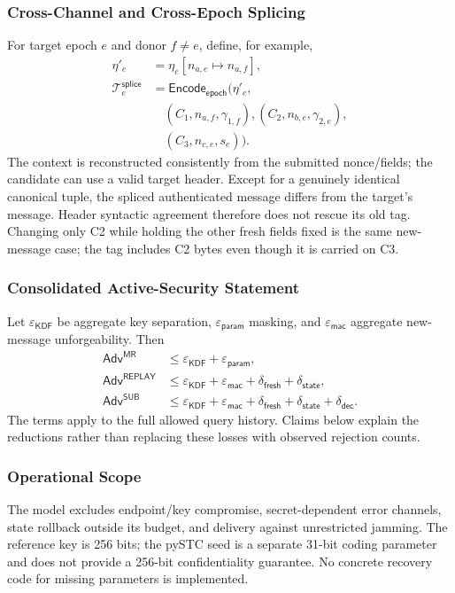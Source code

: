 \documentclass[journal]{IEEEtran}
\theoremstyle{definition}
\theoremstyle{game}
\begin{document}
\subsubsection{Cross-Channel and Cross-Epoch Splicing}
For target epoch $e$ and donor $f\ne e$, define, for example,
\[
\begin{aligned}
\eta'_e&=\eta_e[n_{a,e}\mapsto n_{a,f}],\\
\mathcal T^{\mathsf{splice}}_e
 &=\mathsf{Encode}_{\mathsf{epoch}}\bigl(\eta'_e,\\
 &\quad(C_1,n_{a,f},\gamma_{1,f}),(C_2,n_{b,e},\gamma_{2,e}),\\
 &\quad(C_3,n_{c,e},s_e)\bigr).
\end{aligned}
\]
The context is reconstructed consistently from the submitted nonce/fields;
the candidate can use a valid target header. Except for a genuinely identical
canonical tuple, the spliced authenticated message differs from the target's
message. Header syntactic agreement therefore does not rescue its old tag.
Changing only C2 while holding the other fresh fields fixed is the same
new-message case; the tag includes C2 bytes even though it is carried on C3.

\subsubsection{Consolidated Active-Security Statement}
Let $\varepsilon_{\mathsf{KDF}}$ be aggregate key separation,
$\varepsilon_{\mathsf{param}}$ masking, and
$\varepsilon_{\mathsf{mac}}$ aggregate new-message unforgeability. Then
\begin{align}
\mathsf{Adv}^{\mathsf{MR}}&\le
\varepsilon_{\mathsf{KDF}}+\varepsilon_{\mathsf{param}},\\
\mathsf{Adv}^{\mathsf{REPLAY}}&\le
\varepsilon_{\mathsf{KDF}}+\varepsilon_{\mathsf{mac}}
+\delta_{\mathsf{fresh}}+\delta_{\mathsf{state}},\\
\mathsf{Adv}^{\mathsf{SUB}}&\le
\varepsilon_{\mathsf{KDF}}+\varepsilon_{\mathsf{mac}}
+\delta_{\mathsf{fresh}}+\delta_{\mathsf{state}}+\delta_{\mathsf{dec}}.
\end{align}
The terms apply to the full allowed query history. Claims below explain the
reductions rather than replacing these losses with observed rejection counts.

\subsubsection{Operational Scope}
The model excludes endpoint/key compromise, secret-dependent error channels,
state rollback outside its budget, and delivery against unrestricted jamming.
The reference key is 256 bits; the pySTC seed is a separate 31-bit coding
parameter and does not provide a 256-bit confidentiality guarantee.
No concrete recovery code for missing parameters is implemented.
\end{document}
